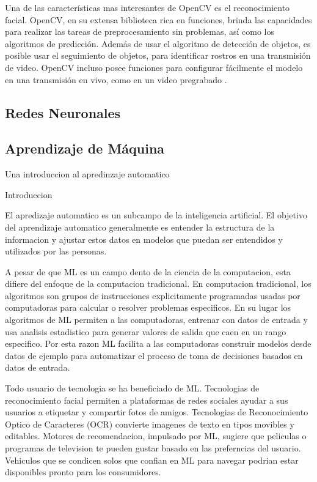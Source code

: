 Una de las características mas interesantes de OpenCV es el reconocimiento facial. OpenCV, en su extensa biblioteca rica en funciones, brinda las capacidades para realizar las tareas de preprocesamiento sin problemas, así como los algoritmos de predicción. Además de usar el algoritmo de detección de objetos, es posible usar el seguimiento de objetos, para identificar rostros en una transmisión de video. OpenCV incluso posee funciones para configurar fácilmente el modelo en una transmisión en vivo, como en un video pregrabado \cite{medium:opencv}. 

\subsection{Redes Neuronales}

\subsection{Aprendizaje de Máquina}
Una introduccion al apredinzaje automatico

Introduccion

El apredizaje automatico es un subcampo de la inteligencia artificial. El objetivo del aprendizaje automatico generalmente es entender la estructura de la informacion y ajustar estos datos en modelos que puedan ser entendidos y utilizados por las personas.

A pesar de que ML es un campo dento de la ciencia de la computacion, esta difiere del enfoque de la computacion tradicional. En computacion tradicional, los algoritmos son grupos de instrucciones explicitamente programadas usadas por computadoras para calcular o resolver problemas especificos. En su lugar los algoritmos de ML permiten a las computadoras, entrenar con datos de entrada y usa analisis estadistico para generar valores de salida que caen en un rango especifico. Por esta razon ML facilita a las computadoras construir modelos desde datos de ejemplo para automatizar el proceso de toma de decisiones basados en datos de entrada.

Todo usuario de tecnologia se ha beneficiado de ML. Tecnologias de reconocimiento facial permiten a plataformas de redes sociales ayudar a sus usuarios a etiquetar y compartir fotos de amigos. Tecnologias de Reconocimiento Optico de Caracteres (OCR) convierte imagenes de texto en tipos movibles y editables. Motores de recomendacion, impulsado por ML, sugiere que peliculas o programas de television te pueden gustar basado en las preferncias del usuario. Vehiculos que se condicen solos que confian en ML para navegar podrian estar disponibles pronto para los consumidores.

